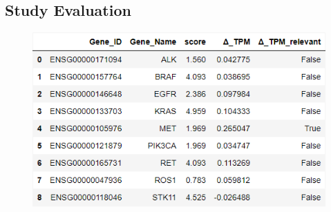 \subsection{Study Evaluation} \label{subsec:evaluation}





\begin{figure}[!h]
    \centering
    \includegraphics[height=\dfheightdouble]{figures/05_01_df_known_genes}
    \caption{}
    \label{fig:05_01_df_known_genes}
\end{figure}


